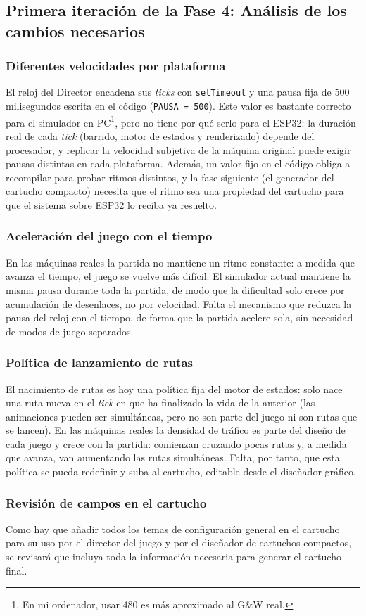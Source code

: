 \subsection{Primera iteración de la Fase 4: Análisis de los cambios necesarios}
\label{subsec:F4I1}

\subsubsection{Diferentes velocidades por plataforma}

El reloj del Director encadena sus \textit{ticks} con \texttt{setTimeout} y
una pausa fija de 500 milisegundos escrita en el código
(\texttt{PAUSA = 500}). Este valor es bastante correcto para el simulador en
PC\footnote{En mi ordenador, usar 480 es más aproximado al G\&W real.},
pero no tiene por qué serlo para el ESP32: la duración real de cada
\textit{tick} (barrido, motor de estados y renderizado) depende del
procesador, y replicar la velocidad subjetiva de la máquina original puede
exigir pausas distintas en cada plataforma. Además, un valor fijo en el
código obliga a recompilar para probar ritmos distintos, y la fase siguiente
(el generador del cartucho compacto) necesita que el ritmo sea una propiedad
del cartucho para que el sistema sobre ESP32 lo reciba ya resuelto.

\subsubsection{Aceleración del juego con el tiempo}

En las máquinas reales la partida no mantiene un ritmo constante: a medida
que avanza el tiempo, el juego se vuelve más difícil. El simulador actual
mantiene la misma pausa durante toda la partida, de modo que la dificultad
solo crece por acumulación de desenlaces, no por velocidad. Falta el
mecanismo que reduzca la pausa del reloj con el tiempo, de forma que la
partida acelere sola, sin necesidad de modos de juego separados.

\subsubsection{Política de lanzamiento de rutas}

El nacimiento de rutas es hoy una política fija del motor de estados: solo
nace una ruta nueva en el \textit{tick} en que ha finalizado la vida de la
anterior (las animaciones pueden ser simultáneas, pero no son parte del juego
ni son rutas que se lancen). En las máquinas reales la densidad de tráfico es
parte del diseño de cada juego y crece con la partida: comienzan cruzando
pocas rutas y, a medida que avanza, van aumentando las rutas simultáneas.
Falta, por tanto, que esta política se pueda redefinir y suba al cartucho,
editable desde el diseñador gráfico.

\subsubsection{Revisión de campos en el cartucho}
Como hay que añadir todos los temas de configuración general en el cartucho para su uso por el director del juego y por el diseñador de cartuchos compactos, se revisará que incluya toda la información necesaria para generar el cartucho final.
